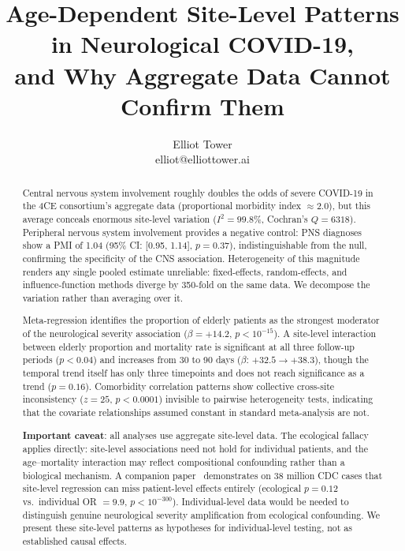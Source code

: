 \documentclass{article}
\title{Age-Dependent Site-Level Patterns in Neurological COVID-19,\\and Why Aggregate Data Cannot Confirm Them}
\author{\name Elliot Tower \\
      \email elliot@elliottower.ai}
\begin{document}
\maketitle

\begin{abstract}
Central nervous system involvement roughly doubles the odds of severe COVID-19 in the 4CE consortium's aggregate data (proportional morbidity index $\approx 2.0$), but this average conceals enormous site-level variation ($I^2 = 99.8\%$, Cochran's $Q = 6318$).
Peripheral nervous system involvement provides a negative control: PNS diagnoses show a PMI of 1.04 (95\% CI: [0.95, 1.14], $p = 0.37$), indistinguishable from the null, confirming the specificity of the CNS association.
Heterogeneity of this magnitude renders any single pooled estimate unreliable: fixed-effects, random-effects, and influence-function methods diverge by 350-fold on the same data.
We decompose the variation rather than averaging over it.

Meta-regression identifies the proportion of elderly patients as the strongest moderator of the neurological severity association ($\beta = +14.2$, $p < 10^{-15}$).
A site-level interaction between elderly proportion and mortality rate is significant at all three follow-up periods ($p < 0.04$) and increases from 30 to 90 days ($\beta$: $+32.5 \to +38.3$), though the temporal trend itself has only three timepoints and does not reach significance as a trend ($p = 0.16$).
Comorbidity correlation patterns show collective cross-site inconsistency ($z = 25$, $p < 0.0001$) invisible to pairwise heterogeneity tests, indicating that the covariate relationships assumed constant in standard meta-analysis are not.

\textbf{Important caveat}: all analyses use aggregate site-level data.
The ecological fallacy applies directly: site-level associations need not hold for individual patients, and the age--mortality interaction may reflect compositional confounding rather than a biological mechanism.
A companion paper~\cite{tower2025averages} demonstrates on 38 million CDC cases that site-level regression can miss patient-level effects entirely (ecological $p = 0.12$ vs.\ individual OR $= 9.9$, $p < 10^{-300}$).
Individual-level data would be needed to distinguish genuine neurological severity amplification from ecological confounding.
We present these site-level patterns as hypotheses for individual-level testing, not as established causal effects.
\end{abstract}
\end{document}
